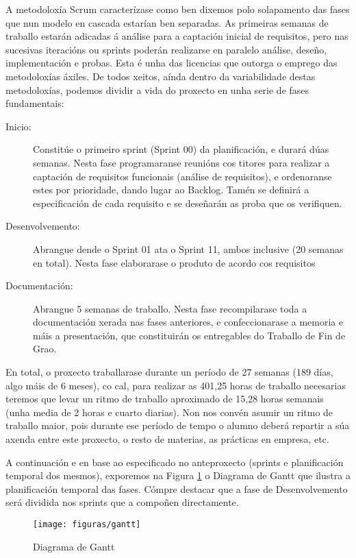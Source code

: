 A metodoloxía Scrum caracterízase como ben dixemos polo solapamento das fases que nun modelo en cascada estarían ben separadas. As primeiras semanas de traballo estarán adicadas á análise para a captación inicial de requisitos, pero nas sucesivas iteracións ou sprints poderán realizarse en paralelo análise, deseño, implementación e probas. Esta é unha das licencias que outorga o emprego das metodoloxías áxiles. De todos xeitos, aínda dentro da variabilidade destas metodoloxías, podemos dividir a vida do proxecto en unha serie de fases fundamentais:
\begin{description}
\item[Inicio:] Constitúe o primeiro sprint (Sprint 00) da planificación, e durará dúas semanas. Nesta fase programaranse reunións cos titores para realizar a captación de requisitos funcionais (análise de requisitos), e ordenaranse estes por prioridade, dando lugar ao Backlog. Tamén se definirá a especificación de cada requisito e se deseñarán as proba que os verifiquen.
\item[Desenvolvemento:] Abrangue dende o Sprint 01 ata o Sprint 11, ambos inclusive (20 semanas en total). Nesta fase elaborarase o produto de acordo cos requisitos
\item[Documentación:] Abrangue 5 semanas de traballo. Nesta fase recompilarase toda a documentación xerada nas fases anteriores, e confeccionarase a memoria e máis a presentación, que constituirán os entregables do Traballo de Fin de Grao.
\end{description}

En total, o proxecto traballarase durante un período de 27 semanas (189 días, algo máis de 6 meses), co cal, para realizar as 401,25 horas de traballo necesarias teremos que levar un ritmo de traballo aproximado de 15,28 horas semanais (unha media de 2 horas e cuarto diarias). Non nos convén asumir un ritmo de traballo maior, pois durante ese período de tempo o alumno deberá repartir a súa axenda entre este proxecto, o resto de materias, as prácticas en empresa, etc.

A continuación e en base ao especificado no anteproxecto (sprints e planificación temporal dos mesmos), exporemos na Figura \ref{gantt} o Diagrama de Gantt que ilustra a planificación temporal das fases. Cómpre destacar que a fase de Desenvolvemento será dividida nos sprints que a compoñen directamente.

\begin{figure}
\centering
\texttt{[image: figuras/gantt]}
\caption{Diagrama de Gantt}
\label{gantt}
\end{figure}

